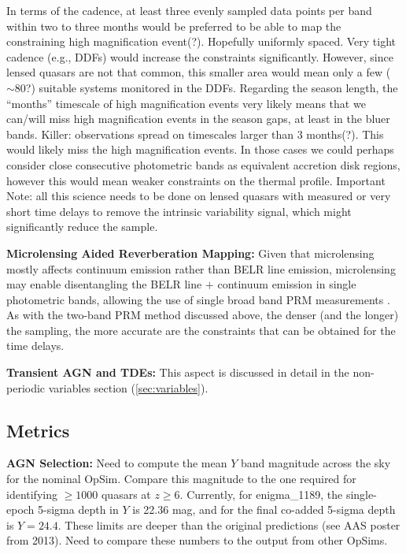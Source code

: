 In terms of the cadence, at least three evenly sampled data points per band within two to three months would be preferred to be able to map the constraining high magnification event(?). Hopefully uniformly spaced. Very tight cadence (e.g., DDFs) would increase the constraints significantly. However, since lensed quasars are not that common, this smaller area would mean only a few ($\sim80$?) suitable systems monitored in the DDFs.
%
Regarding the season length, the ``months'' timescale of high magnification events very likely means that we can/will miss high magnification events in the season gaps, at least in the bluer bands.
%
Killer: observations spread on timescales larger than 3 months(?). This would likely miss the high magnification events. In those cases we could perhaps consider close consecutive photometric bands as equivalent accretion disk regions, however this would mean weaker constraints on the thermal profile.
%
Important Note: all this science needs to be done on lensed quasars with measured or very short time delays to remove the intrinsic variability signal, which might significantly reduce the sample.

{\bf Microlensing Aided Reverberation Mapping:} Given that microlensing mostly affects continuum emission rather than BELR line emission, microlensing may enable disentangling the BELR line $+$ continuum emission in single photometric bands, allowing the use of single broad band PRM measurements \citep{SluseandTewes2014}. As with the two-band PRM method discussed above, the denser (and the longer) the sampling, the more accurate are the constraints that can be obtained for the time delays.

{\bf Transient AGN and TDEs:} This aspect is discussed in detail in the non-periodic variables section (\autoref{sec:variables}).


\subsection{Metrics}
\label{sec:\secname:metrics}


{\bf AGN Selection:} Need to compute the mean $Y$ band magnitude
across the sky for the nominal OpSim. Compare this magnitude to the
one required for identifying $\geq1000$ quasars
at $z\geq6$. Currently, for enigma\_1189, the single-epoch 5-sigma
depth in $Y$ is 22.36 mag, and for the final co-added 5-sigma depth is
$Y=24.4$. These limits are deeper than the original predictions (see
AAS poster from 2013). Need to compare these numbers to the output
from other OpSims.

